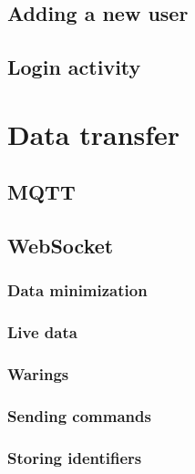 \subsection{Adding a new user}
\label{subsec:adding_a_new_user}



\subsection{Login activity}
\label{subsec:login_activity}





\section{Data transfer}
\label{sec:data_transfer}



\subsection{MQTT}
\label{subsec:mqtt}



\subsection{WebSocket}
\label{subsec:websocket}


\subsubsection{Data minimization}
\label{subsec:data_minimization}


\subsubsection{Live data}
\label{subsec:live_data}


\subsubsection{Warings}
\label{subsec:warnings}


\subsubsection{Sending commands}
\label{subsec:sending_commands}


\subsubsection{Storing identifiers}
\label{subsec:storing_identifiers}
